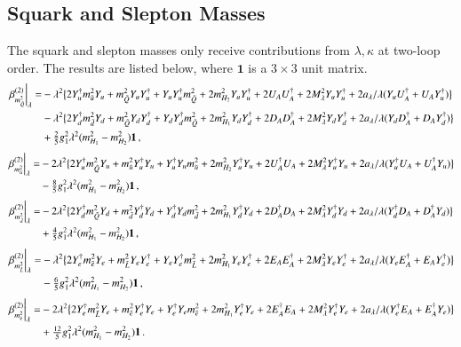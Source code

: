 \documentclass[final,3p,times]{elsarticle}
\newcommand{\lamsq}{\lambda^2}
\newcommand{\mhusq}{m^2_{H_2}}
\newcommand{\mhdsq}{m^2_{H_1}}
\newcommand{\mlamsq}{M_\lambda^2}
\newcommand{\mqsq}{m_{\tilde{Q}}^2}
\newcommand{\mdsq}{m_{\tilde{d}}^2}
\newcommand{\musq}{m_{\tilde{u}}^2}
\newcommand{\mlsq}{m_{\tilde{L}}^2}
\newcommand{\mesq}{m_{\tilde{e}}^2}
\begin{document}
\subsection{Squark and Slepton Masses}
The squark and slepton masses only receive contributions from $\lambda,\kappa$ at two-loop order.  The results are listed below, where $\mathbf{1}$ is a $3\times 3$ unit matrix.
%
\begin{align}
\left.\beta_{\mqsq}^{(2)}\right|_\lambda =& -\lamsq \big\{ 2 Y_u^\dagger\musq Y_u + \mqsq Y_u Y_u^\dagger +  Y_u Y_u^\dagger\mqsq \notag 
+ 2\mhusq Y_u Y_u^\dagger + 2 U_A U_A^\dagger + 2\mlamsq Y_u Y_u^\dagger 
+ 2a_\lambda/\lambda(  Y_u U_A^\dagger +  U_A Y_u^\dagger) \big\} \notag \\
%
&-\lamsq\big\{ 2 Y_d^\dagger\mdsq Y_d + \mqsq Y_d Y_d^\dagger +  Y_d Y_d^\dagger\mqsq 
+ 2\mhdsq Y_d Y_d^\dagger + 2 D_A D_A^\dagger + 2\mlamsq Y_d Y_d^\dagger 
+ 2a_\lambda/\lambda(  Y_d D_A^\dagger +  D_A Y_d^\dagger) \big\} \notag \\
%
&+ \tfrac{2}{5}g_1^2\lamsq(\mhdsq - \mhusq)\mathbf{1}\,,
\end{align}
%
%
\begin{align}
\left.\beta_{\musq}^{(2)}\right|_\lambda =& -2\lamsq \big\{ 2 Y_u^\dagger\mqsq Y_u + \musq Y_u^\dagger Y_u +  Y_u^\dagger Y_u\musq 
+ 2\mhusq Y_u^\dagger Y_u + 2 U_A^\dagger U_A + 2\mlamsq Y_u^\dagger Y_u 
+ 2a_\lambda/\lambda(  Y_u^\dagger U_A +  U_A^\dagger Y_u) \big\}  \notag \\
%
&- \tfrac{8}{5}g_1^2\lamsq(\mhdsq - \mhusq)\mathbf{1}\,,
\end{align}
%
%
\begin{align}
\left.\beta_{\mdsq}^{(2)}\right|_\lambda =& -2\lamsq \big\{ 2 Y_d^\dagger\mqsq Y_d + \mdsq Y_d^\dagger Y_d +  Y_d^\dagger Y_d\mdsq 
+ 2\mhdsq Y_d^\dagger Y_d + 2 D_A^\dagger D_A + 2\mlamsq Y_d^\dagger Y_d 
+ 2a_\lambda/\lambda(  Y_d^\dagger D_A +  D_A^\dagger Y_d) \big\} \notag \\
%
&+ \tfrac{4}{5}g_1^2\lamsq(\mhdsq - \mhusq)\mathbf{1}\,,
\end{align}
%
%
\begin{align}
\left.\beta_{\mlsq}^{(2)}\right|_\lambda =& -\lamsq \big\{ 2 Y_e^\dagger\mesq Y_e + \mlsq Y_e Y_e^\dagger +  Y_e Y_e^\dagger\mlsq 
+ 2\mhdsq Y_e Y_e^\dagger + 2 E_A E_A^\dagger + 2\mlamsq Y_e Y_e^\dagger 
+ 2a_\lambda/\lambda(  Y_e E_A^\dagger +  E_A Y_e^\dagger) \big\} \notag \\
%
&- \tfrac{6}{5}g_1^2\lamsq(\mhdsq - \mhusq)\mathbf{1}\,,
\end{align}
%
%
\begin{align}
\left.\beta_{\mesq}^{(2)}\right|_\lambda =& -2\lamsq \big\{ 2 Y_e^\dagger\mlsq Y_e + \mesq Y_e^\dagger Y_e +  Y_e^\dagger Y_e\mesq 
+ 2\mhdsq Y_e^\dagger Y_e + 2 E_A^\dagger E_A + 2\mlamsq Y_e^\dagger Y_e
+ 2a_\lambda/\lambda(  Y_e^\dagger E_A +  E_A^\dagger Y_e) \big\} \notag \\
%
&+ \tfrac{12}{5}g_1^2\lamsq(\mhdsq - \mhusq)\mathbf{1}\,.
\end{align}
\end{document}
